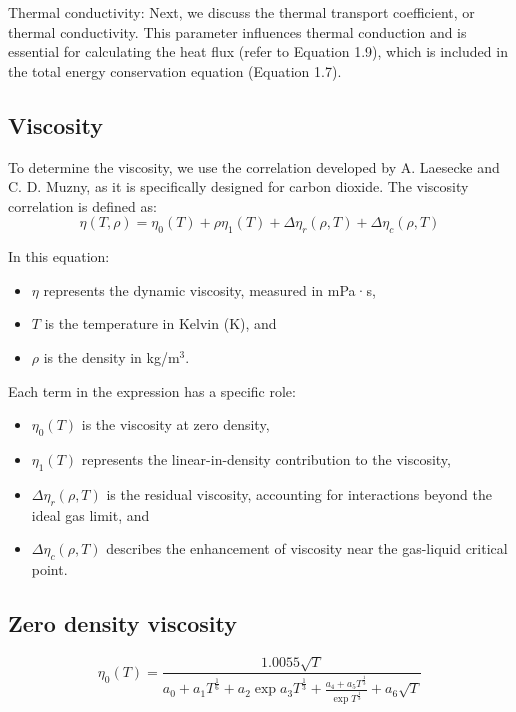     Thermal conductivity: Next, we discuss the thermal transport coefficient, or
    thermal conductivity. This parameter influences thermal conduction and is
    essential for calculating the heat flux (refer to Equation 1.9), which is
    included in the total energy conservation equation (Equation 1.7).

\subsection{Viscosity}

To determine the viscosity, we use the correlation developed by A. Laesecke and
C. D. Muzny, as it is specifically designed for carbon dioxide.
The viscosity correlation is defined as:
\begin{equation}
    \eta(T,\rho) = \eta_0(T) + \rho\eta_1(T) + \Delta\eta_r(\rho,T) + \Delta\eta_c(\rho,T)
\end{equation}

In this equation:
\begin{itemize}
    \item $\eta$ represents the dynamic viscosity, measured in mPa·s,
    \item $T$ is the temperature in Kelvin (K), and
    \item $\rho$ is the density in kg/m$^3$.
\end{itemize}

Each term in the expression has a specific role:
\begin{itemize}
    \item $\eta_0(T)$ is the viscosity at zero density,
    \item $\eta_1(T)$ represents the linear-in-density contribution to the viscosity,
    \item $\Delta \eta_r(\rho, T)$ is the residual viscosity, accounting for interactions beyond the ideal gas limit, and
    \item $\Delta \eta_c(\rho, T)$ describes the enhancement of viscosity near the gas-liquid critical point.
\end{itemize}

\subsection{Zero density viscosity}
\begin{equation}
    \eta_0(T) = \frac{1.0055\sqrt{T}}{a_0 + a_1T^{\frac{1}{6}}+ a_2\exp{a_3T^{\frac{1}{3}}} + \frac{a_4 + a_5T^{\frac{1}{3}}}{\exp{T^{\frac{1}{3}}}} + a_6\sqrt{T}}
\end{equation}


